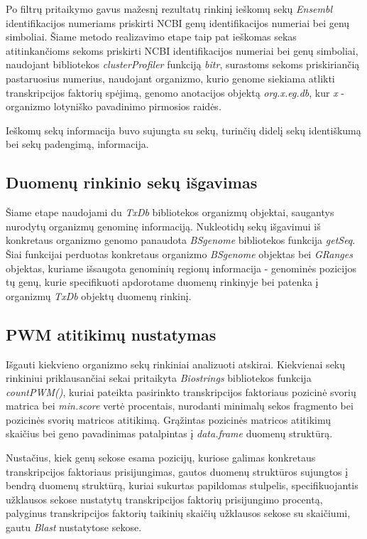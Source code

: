 \documentclass[12pt]{article}
\begin{document}
Po filtrų pritaikymo gavus mažesnį rezultatų rinkinį ieškomų sekų \emph{Ensembl}
identifikacijos numeriams priskirti NCBI genų identifikacijos numeriai bei
genų simboliai. Šiame metodo realizavimo etape taip pat ieškomas sekas
atitinkančioms sekoms priskirti NCBI identifikacijos numeriai bei genų
simboliai, naudojant bibliotekos \emph{clusterProfiler}\cite{CLUSTERPROFILER}
funkciją \emph{bitr}, surastoms sekoms priskiriančią pastaruosius numerius,
naudojant organizmo, kurio genome siekiama atlikti transkripcijos faktorių
spėjimą, genomo anotacijos objektą \emph{org.x.eg.db}, kur \emph{x} - organizmo
lotyniško pavadinimo pirmosios raidės.

Ieškomų sekų informacija buvo sujungta su sekų, turinčių didelį sekų identiškumą
bei sekų padengimą, informacija.

\subsection{Duomenų rinkinio sekų išgavimas}
Šiame etape naudojami du \emph{TxDb} bibliotekos organizmų objektai,
saugantys nurodytų organizmų genominę informaciją. Nukleotidų sekų išgavimui iš
konkretaus organizmo genomo panaudota \emph{BSgenome} bibliotekos funkcija
\emph{getSeq}. Šiai funkcijai perduotas konkretaus organizmo \emph{BSgenome}
objektas bei \emph{GRanges} objektas, kuriame išsaugota genominių regionų
informacija - genominės pozicijos tų genų, kurie specifikuoti apdorotame duomenų
rinkinyje bei patenka į organizmų \emph{TxDb} objektų duomenų rinkinį.

\subsection{PWM atitikimų nustatymas}
Išgauti kiekvieno organizmo sekų rinkiniai analizuoti atskirai. Kiekvienai
sekų rinkiniui priklausančiai sekai pritaikyta \emph{Biostrings} bibliotekos
funkcija \emph{countPWM()}, kuriai pateikta pasirinkto transkripcijos faktoriaus
pozicinė svorių matrica bei \emph{min.score} vertė procentais, nurodanti
minimalų sekos fragmento bei pozicinės svorių matricos atitikimą. Grąžintas
pozicinės matricos atitikimų skaičius bei geno pavadinimas patalpintas į
\emph{data.frame} duomenų struktūrą.

Nustačius, kiek genų sekose esama pozicijų, kuriose galimas konkretaus
transkripcijos faktoriaus prisijungimas, gautos duomenų struktūros sujungtos
į bendrą duomenų struktūrą, kuriai sukurtas papildomas stulpelis,
specifikuojantis užklausos sekose nustatytų transkripcijos faktorių
prisijungimo procentą, palyginus transkripcijos faktorių taikinių skaičių
užklausos sekose su skaičiumi, gautu \emph{Blast} nustatytose sekose. 
\end{document}
